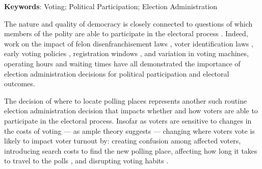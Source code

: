 \documentclass{cup_PSRM}
\begin{document}
\vspace{.2in}
\textbf{Keywords}: Voting; Political Participation; Election Administration




\noindent  The nature and quality of democracy is closely connected to questions of which members of the polity are able to participate in the electoral process \citep{keyssar2009right}. Indeed, work on the impact of felon disenfranchisement laws \citep{gerber2017does}, voter identification laws \citep{grimmer2017comment, highton2017voter, citrin2014effects}, early voting policies \citep{fullmer2015,burden2017complicated}, registration windows \citep{burden2014election, hanmer2009discount, leighley2013votes}, and variation in voting machines, operating hours and waiting times \citep{herron2016precinct, herron2015precinct, highton2006long, stewart2015waiting, pettigrew2017racial} have all demonstrated the importance of election administration decisions for political participation and electoral outcomes.

The decision of where to locate polling places represents another such routine election administration decision that impacts whether and how voters are able to participate in the electoral process.  Insofar as voters are sensitive to changes in the costs of voting --- as ample theory suggests \citep{downs1957, wolfinger1980votes, powell1986american, highton2004voter} --- changing where voters vote is likely to impact voter turnout by: creating confusion among affected voters, introducing search costs to find the new polling place, affecting how long it takes to travel to the polls \citep{brady2011turning, amos2017reprecincting}, and disrupting voting habits \citep{brody1977life, plutzer2002becoming, gerber2003voting}.
\end{document}
